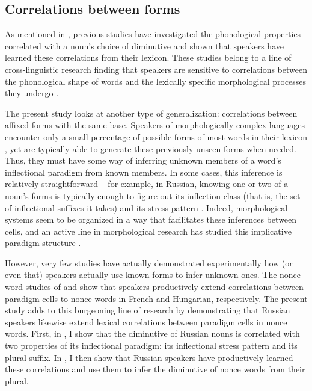 \documentclass[output=paper,colorlinks,citecolor=brown
]{langscibook}
\begin{document}
\subsection{Correlations between forms}
As mentioned in , previous studies have investigated the phonological properties correlated with a noun's choice of diminutive and shown that speakers have learned these correlations from their lexicon. These studies belong to a line of cross-linguistic research finding that speakers are sensitive to correlations between the phonological shape of words and the lexically specific morphological processes they undergo \citep[e.g.][]{Albright.Hayes2003,Becker2009,Hayes.etal2009,Becker.etal2011}.

The present study looks at another type of generalization: correlations between affixed forms with the same base. Speakers of morphologically complex languages encounter only a small percentage of possible forms of most words in their lexicon \citep{Chan2008}, yet are typically able to generate these previously unseen forms when needed. Thus, they must have some way of inferring unknown members of a word's inflectional paradigm from known members. In some cases, this inference is relatively straightforward -- for example, in Russian, knowing one or two of a noun's forms is typically enough to figure out its inflection class (that is, the set of inflectional suffixes it takes) and its stress pattern \citep[though there are complexities in this inference process that are often ignored; see][]{Parker.Sims2020}. Indeed, morphological systems seem to be organized in a way that facilitates these inferences between cells, and an active line in morphological research has studied this implicative paradigm structure \citep[e.g.][]{Wurzel1989,Ackerman.etal2009,Ackerman.Malouf2013,Bonami.Beniamine2016}.

However, very few studies have actually demonstrated experimentally how (or even that) speakers actually use known forms to infer unknown ones. The nonce word studies of \citet{Copot.Bonami2023} and \citet{Tabachnick2024} show that speakers productively extend correlations between paradigm cells to nonce words in French and Hungarian, respectively. The present study adds to this burgeoning line of research by demonstrating that Russian speakers likewise extend lexical correlations between paradigm cells in nonce words. First, in , I show that the diminutive of Russian nouns is correlated with two properties of its inflectional paradigm: its inflectional stress pattern and its plural suffix. In , I then show that Russian speakers have productively learned these correlations and use them to infer the diminutive of nonce words from their plural.
\end{document}
